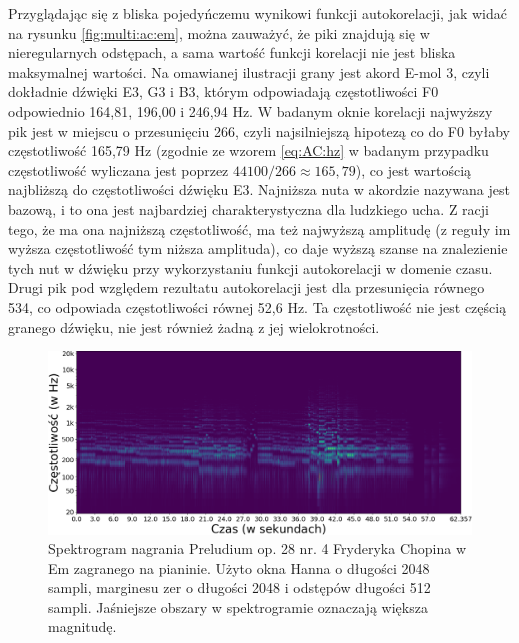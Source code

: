 \documentclass[12pt,a4paper,twoside]{mwart}
\begin{document}
Przyglądając się z bliska pojedyńczemu wynikowi funkcji autokorelacji, jak widać na rysunku \ref{fig:multi:ac:em}, można zauważyć, że piki znajdują się w nieregularnych odstępach, a sama wartość funkcji korelacji nie jest bliska maksymalnej wartości. Na omawianej ilustracji grany jest akord E-mol 3, czyli dokładnie dźwięki E3, G3 i B3, którym odpowiadają częstotliwości F0 odpowiednio 164,81, 196,00 i 246,94 Hz. W badanym oknie korelacji najwyższy pik jest w miejscu o przesunięciu 266, czyli najsilniejszą hipotezą co do F0 byłaby częstotliwość 165,79 Hz (zgodnie ze wzorem \ref{eq:AC:hz} w badanym przypadku częstotliwość wyliczana jest poprzez $44100 / 266 \approx 165,79$), co jest wartością najbliższą do częstotliwości dźwięku E3. Najniższa nuta w akordzie nazywana jest bazową, i to ona jest najbardziej charakterystyczna dla ludzkiego ucha. Z racji tego, że ma ona najniższą częstotliwość, ma też najwyższą amplitudę (z reguły im wyższa częstotliwość tym niższa amplituda), co daje wyższą szanse na znalezienie tych nut w dźwięku przy wykorzystaniu funkcji autokorelacji w domenie czasu. Drugi pik pod względem rezultatu autokorelacji jest dla przesunięcia równego 534, co odpowiada częstotliwości równej 52,6 Hz. Ta częstotliwość nie jest częścią granego dźwięku, nie jest również żadną z jej wielokrotności.

\begin{figure}[ht]
  \begin{center}
    \includegraphics[scale=0.38]{images/Spectrogram/spectrogram_multi_2048_512_cropped.png}
    \caption{Spektrogram nagrania Preludium op. 28 nr. 4 Fryderyka Chopina w Em zagranego na pianinie. Użyto okna Hanna o długości 2048 sampli, marginesu zer o długości 2048 i odstępów długości 512 sampli. Jaśniejsze obszary w spektrogramie oznaczają większa magnitudę.}
    \label{fig:multi:spectrogram}
  \end{center}
\end{figure}
\end{document}
